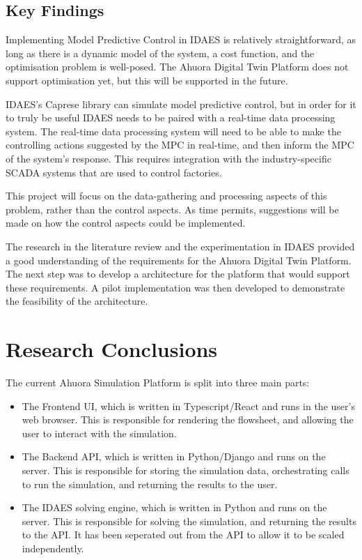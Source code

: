 \documentclass[12pt]{report}
\begin{document}
\subsection{Key Findings}

Implementing Model Predictive Control in IDAES is relatively straightforward, as long as there is a dynamic model of the system, a cost function, and the optimisation problem is well-posed. The Ahuora Digital Twin Platform does not support optimisation yet, but this will be supported in the future.

IDAES's Caprese library can simulate model predictive control, but in order for it to truly be useful IDAES needs to be paired with a real-time data processing system. The real-time data processing system will need to be able to make the controlling actions suggested by the MPC in real-time, and then inform the MPC of the system's response. This requires integration with the industry-specific SCADA systems that are used to control factories.

This project will focus on the data-gathering and processing aspects of this problem, rather than the control aspects. As time permits, suggestions will be made on how the control aspects could be implemented.



The research in the literature review and the experimentation in IDAES provided a good understanding of the requirements for the Ahuora Digital Twin Platform. The next step was to develop a architecture for the platform that would support these requirements. A pilot implementation was then developed to demonstrate the feasibility of the architecture.

\section{Research Conclusions} \label{sec:researchconclusions}

The current Ahuora Simulation Platform is split into three main parts:

\begin{itemize}
    \item The Frontend UI, which is written in Typescript/React and runs in the user's web browser. This is responsible for rendering the flowsheet, and allowing the user to interact with the simulation.
    \item The Backend API, which is written in Python/Django and runs on the server. This is responsible for storing the simulation data, orchestrating calls to run the simulation, and returning the results to the user.
    \item The IDAES solving engine, which is written in Python and runs on the server. This is responsible for solving the simulation, and returning the results to the API. It has been seperated out from the API to allow it to be scaled independently.
\end{itemize}
\end{document}
